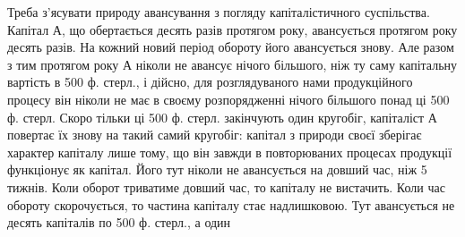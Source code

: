 Треба з’ясувати природу авансування з погляду капіталістичного суспільства.
Капітал А, що обертається десять разів протягом року, авансується
протягом року десять разів. На кожний новий період обороту його авансується
знову. Але разом з тим протягом року А ніколи не авансує нічого
більшого, ніж ту саму капітальну вартість в 500 ф. стерл., і дійсно,
для розглядуваного нами продукційного процесу він ніколи не має в
своєму розпорядженні нічого більшого понад ці 500 ф. стерл. Скоро тільки
ці 500 ф. стерл. закінчують один кругобіг, капіталіст А повертає їх
знову на такий самий кругобіг: капітал з природи своєї зберігає характер
капіталу лише тому, що він завжди в повторюваних процесах продукції
функціонує як капітал. Його тут ніколи не авансується на довший час,
ніж 5 тижнів. Коли оборот триватиме довший час, то капіталу не вистачить.
Коли час обороту скорочується, то частина капіталу стає надлишковою.
Тут авансується не десять капіталів по 500 ф. стерл., а один
\parbreak{}  %
